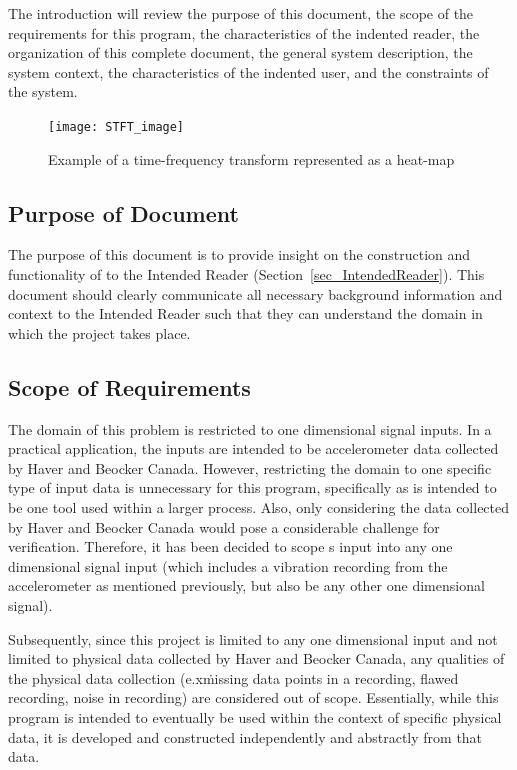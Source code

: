 \documentclass[12pt]{article}
\begin{document}
The introduction will review the purpose of this document, the scope of the requirements for this program, the characteristics of the indented reader, the organization of this complete document, the general system description, the system context, the characteristics of the indented user, and the constraints of the system. 

\begin{figure}[h!]
\begin{center}
 \texttt{[image: STFT\_image]}
\caption{Example of a time-frequency transform represented as a heat-map}
\label{Fig_heatmap} 
\end{center}
\end{figure}

\subsection{Purpose of Document}
The purpose of this document is to provide insight on the construction and functionality of \progname{} to the Intended Reader (Section~\ref{sec_IntendedReader}). This document should clearly communicate all necessary background information and context to the Intended Reader such that they can understand the domain in which the project takes place.

\subsection{Scope of Requirements} 
The domain of this problem is restricted to one dimensional signal inputs. In a practical application, the inputs are intended to be accelerometer data collected by Haver and Beocker Canada. However, restricting the domain to one specific type of input data is unnecessary for this program, specifically as \progname{} is intended to be one tool used within a larger process. Also, only considering the data collected by Haver and Beocker Canada would pose a considerable challenge for verification. Therefore, it has been decided to scope \progname{}s input into any one dimensional signal input (which includes a vibration recording from the accelerometer as mentioned previously, but also be any other one dimensional signal).

Subsequently, since this project is limited to any one dimensional input and not limited to physical data collected by Haver and Beocker Canada, any qualities of the physical data collection (e.x\. missing data points in a recording, flawed recording, noise in recording) are considered out of scope. Essentially, while this program is intended to eventually be used within the context of specific physical data, it is developed and constructed independently and abstractly from that data. \\
\end{document}
